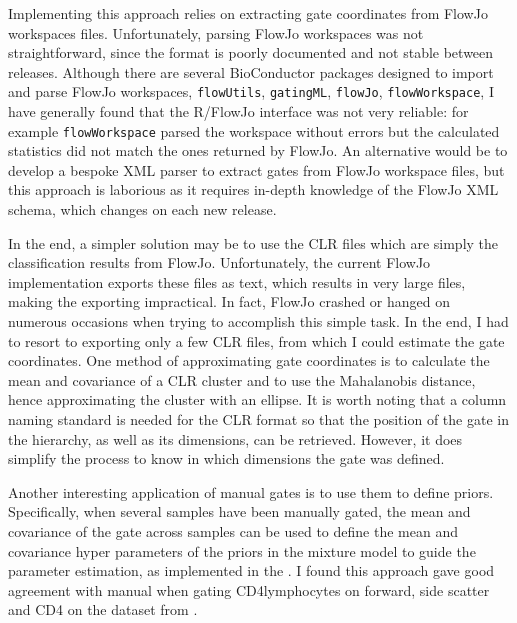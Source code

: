 Implementing this approach relies on extracting gate coordinates from FlowJo workspaces files.
Unfortunately, parsing FlowJo workspaces was not straightforward, since the format is poorly documented and not stable between releases.
Although there are several BioConductor packages designed to import and parse FlowJo workspaces, \texttt{flowUtils}, \texttt{gatingML}, \texttt{flowJo}, \texttt{flowWorkspace}, I have generally found that the R/FlowJo interface was not very reliable: for example \texttt{flowWorkspace} parsed the workspace without errors but the calculated statistics did not match the ones returned by FlowJo.
An alternative would be to develop a bespoke XML parser to extract gates from FlowJo workspace files, but this approach is laborious as it requires in-depth knowledge of the FlowJo XML schema, which changes on each new release.

In the end, a simpler solution may be to use the CLR files which are simply the classification results from FlowJo.
Unfortunately, the current FlowJo implementation exports these files as text, which results in very large files, making the exporting impractical. 
In fact, FlowJo crashed or hanged on numerous occasions when trying to accomplish this simple task.
In the end, I had to resort to exporting only a few CLR files, from which I could estimate the gate coordinates.
One method of approximating gate coordinates is to calculate the mean and covariance of a CLR cluster and to use the Mahalanobis distance, hence approximating the cluster with an ellipse.
It is worth noting that a column naming standard is needed for the CLR format so that the position of the gate in the hierarchy, as well as its dimensions, can be retrieved.
However, it does simplify the process to know in which dimensions the gate was defined.

Another interesting application of manual gates is to use them to define priors.
Specifically, when several samples have been manually gated, the mean and covariance of the gate across samples can be used to define the mean and covariance hyper parameters of the priors in the mixture model to guide the parameter estimation, as implemented in the .
I found this approach gave good agreement with manual when gating CD4\positive lymphocytes on forward, side scatter and CD4 on the dataset from .

